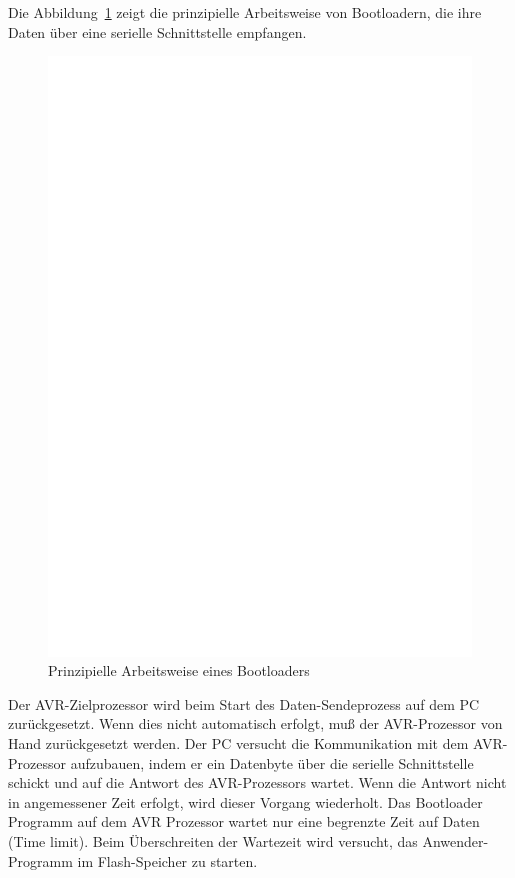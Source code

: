 Die Abbildung~\ref{fig:ablauf} zeigt die prinzipielle Arbeitsweise
von Bootloadern, die ihre Daten über eine serielle Schnittstelle
empfangen.

\begin{figure}[H]
\centering
\includegraphics[]{../FIG/ablauf.eps}
\caption{Prinzipielle Arbeitsweise eines Bootloaders}
\label{fig:ablauf}
\end{figure}

Der AVR-Zielprozessor wird beim Start des Daten-Sendeprozess auf dem PC
zurückgesetzt. Wenn dies nicht automatisch erfolgt, muß der AVR-Prozessor
von Hand zurückgesetzt werden. 
Der PC versucht die Kommunikation mit dem AVR-Prozessor aufzubauen, indem er ein
Datenbyte über die serielle Schnittstelle schickt und auf die Antwort
des AVR-Prozessors wartet. Wenn die Antwort nicht in angemessener Zeit erfolgt,
wird dieser Vorgang wiederholt.
Das Bootloader Programm auf dem AVR Prozessor wartet nur eine begrenzte
Zeit auf Daten (Time limit). Beim Überschreiten der Wartezeit wird
versucht, das Anwender-Programm im Flash-Speicher zu starten.
